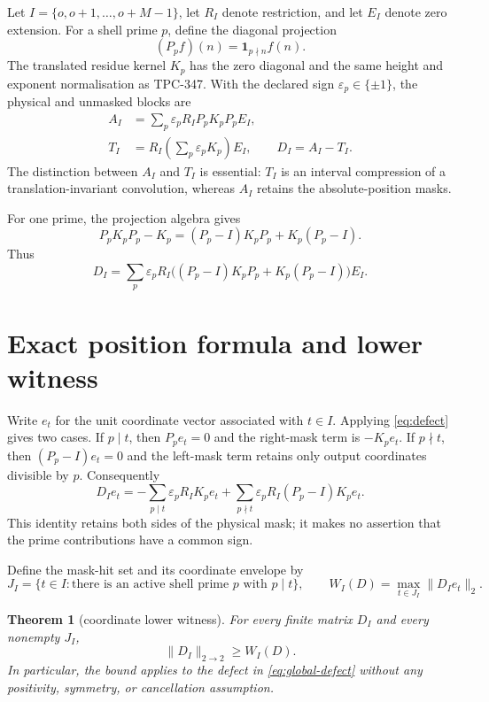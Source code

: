 \documentclass[10pt]{article}
\newtheorem{theorem}{Theorem}
\begin{document}
Let $I=\{o,o+1,\ldots,o+M-1\}$, let $R_I$ denote restriction, and let $E_I$
denote zero extension.  For a shell prime $p$, define the diagonal projection
\[
 (P_p f)(n)=\mathbf 1_{p\nmid n}f(n).
\]
The translated residue kernel $K_p$ has the zero diagonal and the same
height and exponent normalisation as TPC-347.  With the declared sign
$\varepsilon_p\in\{\pm1\}$, the physical and unmasked blocks are
\begin{align*}
 A_I&=\sum_{p}\varepsilon_p R_I P_pK_pP_pE_I,\\
 T_I&=R_I\left(\sum_p\varepsilon_pK_p\right)E_I,
 \qquad D_I=A_I-T_I.
\end{align*}
The distinction between $A_I$ and $T_I$ is essential: $T_I$ is an interval
compression of a translation-invariant convolution, whereas $A_I$ retains
the absolute-position masks.

For one prime, the projection algebra gives
\begin{equation}
 P_pK_pP_p-K_p=(P_p-I)K_pP_p+K_p(P_p-I).
 \label{eq:defect}
\end{equation}
Thus
\begin{equation}
 D_I=\sum_p\varepsilon_pR_I\bigl((P_p-I)K_pP_p
                 +K_p(P_p-I)\bigr)E_I.
 \label{eq:global-defect}
\end{equation}

\section{Exact position formula and lower witness}

Write $e_t$ for the unit coordinate vector associated with $t\in I$.  Applying
\eqref{eq:defect} gives two cases.  If $p\mid t$, then $P_pe_t=0$ and the
right-mask term is $-K_pe_t$.  If $p\nmid t$, then $(P_p-I)e_t=0$ and the
left-mask term retains only output coordinates divisible by $p$.  Consequently
\begin{equation}
 D_Ie_t=-\sum_{p\mid t}\varepsilon_pR_IK_pe_t
       +\sum_{p\nmid t}\varepsilon_pR_I(P_p-I)K_pe_t.
 \label{eq:column-formula}
\end{equation}
This identity retains both sides of the physical mask; it makes no assertion
that the prime contributions have a common sign.

Define the mask-hit set and its coordinate envelope by
\[
 J_I=\{t\in I:\text{there is an active shell prime }p\text{ with }p\mid t\},
 \qquad
 W_I(D)=\max_{t\in J_I}\|D_Ie_t\|_2.
\]

\begin{theorem}[coordinate lower witness]
For every finite matrix $D_I$ and every nonempty $J_I$,
\begin{equation}
 \|D_I\|_{2\to2}\geq W_I(D).
 \label{eq:witness}
\end{equation}
In particular, the bound applies to the defect in \eqref{eq:global-defect}
without any positivity, symmetry, or cancellation assumption.
\end{theorem}
\end{document}
